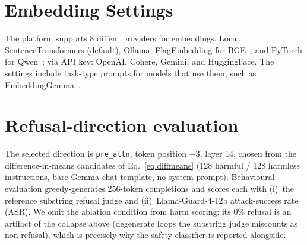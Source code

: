 \documentclass[11pt]{article}
\begin{document}







\appendix

\section{Embedding Settings}
\label{app:embedding}

The platform supports 8 diffent providers for embeddings. Local: SentenceTransformers (default), Ollama, FlagEmbedding for BGE~\cite{chen-etal-2024-m3}, and PyTorch for Qwen~\cite{zhang2025qwen3embeddingadvancingtext}; via API key: OpenAI, Cohere, Gemini, and HuggingFace. The settings include task-type prompts for models that use them, such as EmbeddingGemma~\cite{vera2025embeddinggemmapowerfullightweighttext}. 


\section{Refusal-direction evaluation}
\label{app:refusal}

The selected direction is \texttt{pre\_attn}, token position $-3$, layer 14, chosen from the difference-in-means candidates of Eq.~\ref{eq:diffmeans} (128 harmful / 128 harmless instructions, bare Gemma chat template, no system prompt). Behavioural evaluation greedy-generates 256-token completions and scores each with (i)~the reference substring refusal judge and (ii)~Llama-Guard-4-12b attack-success rate (ASR). We omit the ablation condition from harm scoring: its 0\% refusal is an artifact of the collapse above (degenerate loops the substring judge miscounts as non-refusal), which is precisely why the safety classifier is reported alongside.
\end{document}
